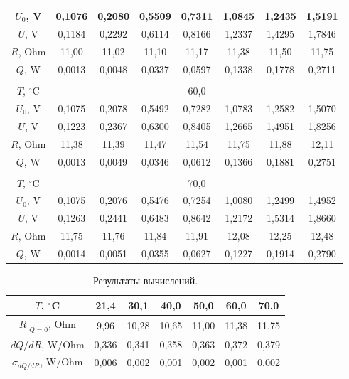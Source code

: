 \documentclass[a4paper,12pt]{article} %
\begin{document}
\begin{enumerate}
\begin{table}[h!]
\begin{tabular}{|c|c|c|c|c|c|c|c|}
$U_0$, V   & 0,1076  & 0,2080  & 0,5509  & 0,7311  & 1,0845  & 1,2435  & 1,5191  \\ \hline
$U$, V   & 0,1184  & 0,2292  & 0,6114  & 0,8166  & 1,2337  & 1,4295  & 1,7846  \\ \hline
$R$, Ohm & 11,00 & 11,02 & 11,10 & 11,17 & 11,38 & 11,50 & 11,75 \\ \hline
$Q$, W    & 0,0013  & 0,0048  & 0,0337  & 0,0597  & 0,1338  & 0,1778  & 0,2711  \\ \hline
\multicolumn{8}{|c|}{}                                                        \\ \hline
$T$, $^\circ$C   & \multicolumn{7}{c|}{60,0}                                           \\ \hline
$U_0$, V   & 0,1075  & 0,2078  & 0,5492  & 0,7282  & 1,0783  & 1,2582  & 1,5070  \\ \hline
$U$, V   & 0,1223  & 0,2367  & 0,6300  & 0,8405  & 1,2665  & 1,4951  & 1,8256  \\ \hline
$R$, Ohm & 11,38 & 11,39 & 11,47 & 11,54 & 11,75 & 11,88 & 12,11 \\ \hline
$Q$, W    & 0,0013  & 0,0049  & 0,0346  & 0,0612  & 0,1366  & 0,1881  & 0,2751  \\ \hline
\multicolumn{8}{|c|}{}                                                        \\ \hline
$T$, $^\circ$C   & \multicolumn{7}{c|}{70,0}                                           \\ \hline
$U_0$, V   & 0,1075  & 0,2076  & 0,5476  & 0,7254  & 1,0080  & 1,2499  & 1,4952  \\ \hline
$U$, V   & 0,1263  & 0,2441  & 0,6483  & 0,8642  & 1,2172  & 1,5314  & 1,8660  \\ \hline
$R$, Ohm & 11,75 & 11,76 & 11,84 & 11,91 & 12,08 & 12,25 & 12,48 \\ \hline
$Q$, W    & 0,0014  & 0,0051  & 0,0355  & 0,0627  & 0,1227  & 0,1914  & 0,2790  \\ \hline
\end{tabular}
\end{table}


\begin{table}[h!]
\caption{Результаты вычислений.}
\label{table:results_2}
\begin{tabular}{|c|c|c|c|c|c|c|}
\hline
$T$, $^\circ$C          & 21,4  & 30,1  & 40,0  & 50,0  & 60,0  & 70,0  \\ \hline
$R|_{Q = 0}$, Ohm       & 9,96  & 10,28 & 10,65 & 11,00 & 11,38 & 11,75 \\ \hline
$dQ/dR$, W/Ohm          & 0,336 & 0,341 & 0,358 & 0,363 & 0,372 & 0,379 \\ \hline
$\sigma_{dQ/dR}$, W/Ohm & 0,006 & 0,002 & 0,001 & 0,002 & 0,001 & 0,002 \\ \hline
\end{tabular}
\end{table}




\end{enumerate}
\end{document}
